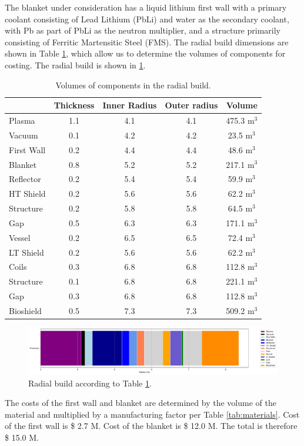 The blanket under consideration has a liquid lithium first wall with a primary coolant consisting of Lead Lithium (PbLi) and water as the secondary coolant, with Pb as part of PbLi as the neutron multiplier, and a structure primarily consisting of Ferritic Martensitic Steel (FMS). The radial build dimensions are shown in Table \ref{tab:volumes}, which allow us to determine the volumes of components for costing.  The radial build is shown in \ref{fig:radial}.  \\


\begin{table}[h!]
    \centering
    \begin{tabular}{l c  c c c}
    \hline
        &	Thickness	&	Inner Radius	&	Outer radius	&	Volume		\\
        \hline
Plasma	&	1.1	&	4.1	&	4.1	&	475.3	m$^{3}$	\\
Vacuum	&	0.1	&	4.2	&	4.2	&	23.5	m$^{3}$	\\
First Wall	&	0.2	&	4.4	&	4.4	&	48.6	m$^{3}$	\\
Blanket	&	0.8	&	5.2	&	5.2	&	217.1	m$^{3}$	\\
Reflector	&	0.2	&	5.4	&	5.4	&	59.9	m$^{3}$	\\
HT Shield	&	0.2	&	5.6	&	5.6	&	62.2	m$^{3}$	\\
Structure	&	0.2	&	5.8	&	5.8	&	64.5	m$^{3}$	\\
Gap	&	0.5	&	6.3	&	6.3	&	171.1	m$^{3}$	\\
Vessel	&	0.2	&	6.5	&	6.5	&	72.4	m$^{3}$	\\
LT Shield	&	0.2	&	5.6	&	5.6	&	62.2	m$^{3}$	\\
Coils	&	0.3	&	6.8	&	6.8	&	112.8	m$^{3}$	\\
Structure	&	0.1	&	6.8	&	6.8	&	221.1	m$^{3}$	\\
Gap	&	0.3	&	6.8	&	6.8	&	112.8	m$^{3}$	\\
Bioshield	&	0.5	&	7.3	&	7.3	&	509.2	m$^{3}$	\\

        \hline
    \end{tabular}
    \caption{Volumes of components in the radial build.}
    \label{tab:volumes}
\end{table}

\begin{figure}
    \centering
    \includegraphics[width=0.9\linewidth]{Figures/radial_build.pdf}
    \caption{Radial build according to Table \ref{tab:volumes}.}
    \label{fig:radial}
\end{figure}



The costs of the first wall and blanket are determined by the volume of the material and multiplied by a manufacturing factor per Table \ref{tab:materials}.   Cost of the first wall is \$ 2.7 M.  Cost of the blanket is \$ 12.0 M. The total is therefore \$ 15.0 M.

